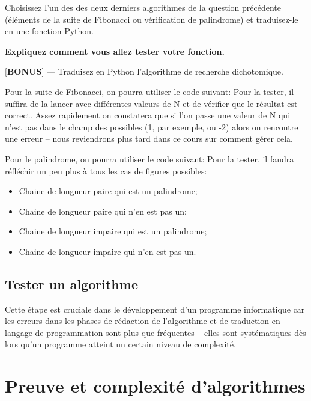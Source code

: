 \documentclass[12pt]{article}
\begin{document}
	\begin{MonExo}
		\begin{alphenum}
			\item Choisissez l'un des des deux derniers algorithmes de la question précédente (éléments de la suite de Fibonacci ou vérification de palindrome) et traduisez-le en une fonction Python.
			\item \textbf{Expliquez comment vous allez tester votre fonction.}
			\item \textbf{$[$BONUS$]$} --- Traduisez en Python l'algorithme de recherche dichotomique.
		\end{alphenum}
	\end{MonExo}
	
	\begin{MaReponse}
		Pour la suite de Fibonacci, on pourra utiliser le code suivant:
		Pour la tester, il suffira de la lancer avec différentes valeurs de N et de vérifier que le résultat est correct. Assez rapidement on constatera que si l'on passe une valeur de N qui n'est pas dans le champ des possibles (1, par exemple, ou -2) alors on rencontre une erreur -- nous reviendrons plus tard dans ce cours sur comment gérer cela.
		
		\vspace{\baselineskip}
		Pour le palindrome, on pourra utiliser le code suivant:
		Pour la tester, il faudra réfléchir un peu plus à tous les cas de figures possibles:
		\begin{itemize}
			\item Chaine de longueur paire qui est un palindrome;
			\item Chaine de longueur paire qui n'en est pas un;
			\item Chaine de longueur impaire qui est un palindrome;
			\item Chaine de longueur impaire qui n'en est pas un.
		\end{itemize}
	\end{MaReponse}
	
		 \subsection{Tester un algorithme}
	
	Cette étape est cruciale dans le développement d'un programme informatique car les erreurs dans les phases de rédaction de l'algorithme et de traduction en langage de programmation sont plus que fréquentes -- elles sont systématiques dès lors qu'un programme atteint un certain niveau de complexité.
	
	\pagebreak
	\section{Preuve et complexité d'algorithmes}
\end{document}
